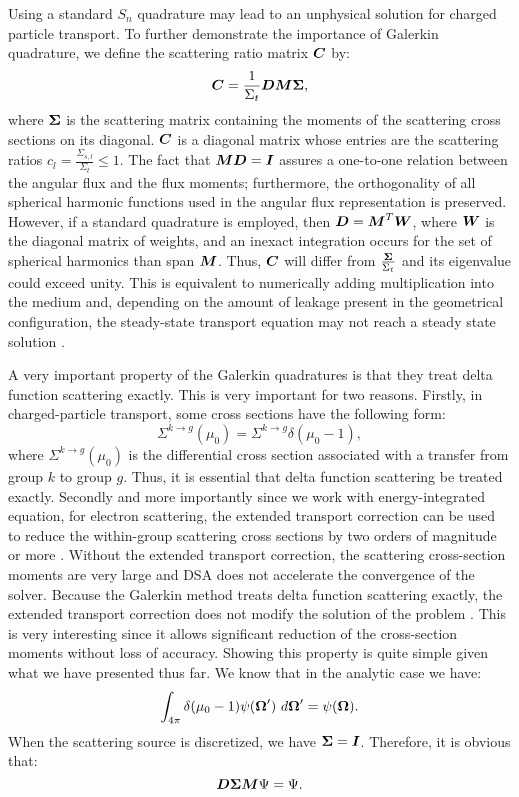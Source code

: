 Using a standard $S_n$ quadrature may lead to an unphysical solution for
charged particle transport. To further demonstrate the importance of Galerkin
quadrature, we define the scattering ratio matrix $\boldsymbol{C}$ by:
\begin{equation}
\boldsymbol{C} = \frac{1}{\Sigma_t}\boldsymbol{D}\boldsymbol{M}\boldsymbol{\Sigma},
\end{equation}
where $\boldsymbol{\Sigma}$ is the scattering matrix containing the moments of the
scattering cross sections on its diagonal.
$\boldsymbol{C}$ is a diagonal matrix whose entries are the scattering ratios
$c_l=\frac{\Sigma_{s,l}}{\Sigma_t} \leq 1$. The fact that $\boldsymbol{MD}=\boldsymbol{I}$
assures a one-to-one relation between the angular flux and the flux moments;
furthermore, the orthogonality of all spherical harmonic functions used in the
angular flux representation is preserved. However, if a standard quadrature is
employed, then $\boldsymbol{D} = \boldsymbol{M}^T \boldsymbol{W}$, where $\boldsymbol{W}$ is the diagonal
matrix of weights, and an inexact integration occurs for the set of spherical
harmonics than span $\boldsymbol{M}$. Thus, $\boldsymbol{C}$ will differ from
$\frac{\boldsymbol{\Sigma}}{\Sigma_t}$ and its eigenvalue could exceed unity. This is
equivalent to numerically adding multiplication into the medium and, depending
on the amount of leakage present in the geometrical configuration, the
steady-state transport equation may not reach a steady state solution
\cite{pautz_fp}.

A very important property of the Galerkin quadratures is that they treat 
delta function scattering exactly. This is very important for two reasons. 
Firstly, in charged-particle transport, some cross sections 
have the following form:
\begin{equation}
\Sigma^{k\rightarrow g}(\mu_0) = \Sigma^{k\rightarrow g} \delta(\mu_0-1),
\end{equation}
where $\Sigma^{k\rightarrow g}(\mu_0)$ is the differential cross section
associated with a transfer from group $k$ to group $g$. Thus, it is essential
that delta function scattering be treated exactly. Secondly and more
importantly since we work with energy-integrated equation, for 
electron scattering, the extended transport correction \cite{lathrop} can be 
used to reduce the within-group scattering cross sections by two orders of 
magnitude or more \cite{morel_79}. Without the extended transport correction, 
the scattering cross-section moments are very large and DSA does not 
accelerate the convergence of the solver. Because the Galerkin method treats 
delta function  scattering exactly, the extended transport correction does not
modify the solution of the problem \cite{morel_79}. This is very interesting 
since it allows significant reduction of the cross-section moments without
loss of accuracy. Showing this property is quite simple given what we have
presented thus far. We know that in the analytic case we have:
\begin{equation}
\int_{4\pi} \delta(\mu_0-1) \psi(\boldsymbol{\Omega}')\ d\boldsymbol{\Omega}' = \psi(\boldsymbol{\Omega}).
\end{equation}
When the scattering source is discretized, we have $\boldsymbol{\Sigma}=\boldsymbol{I}$.
Therefore, it is obvious that:
\begin{equation}
  \boldsymbol{D\Sigma M}\Psi = \Psi.
\end{equation}

